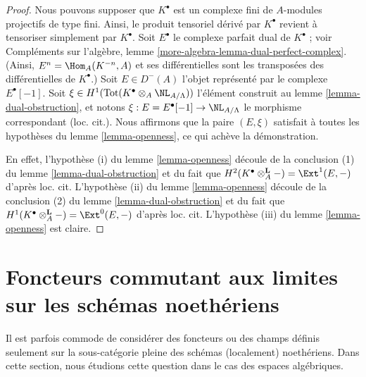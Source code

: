\begin{proof}
Nous pouvons supposer que $K^\bullet$ est un complexe fini de $A$-modules
projectifs de type fini. Ainsi, le produit tensoriel dérivé par $K^\bullet$
revient à tensoriser simplement par $K^\bullet$. Soit $E^\bullet$ le complexe
parfait dual de $K^\bullet$ ; voir Compléments sur l'algèbre, lemme
\ref{more-algebra-lemma-dual-perfect-complex}. (Ainsi,
$E^n = \Hom_A(K^{-n}, A)$ et ses différentielles sont les transposées des
différentielles de $K^\bullet$.) Soit $E \in D^{-}(A)$ l'objet représenté par
le complexe $E^\bullet[-1]$. Soit
$\xi \in H^1(\text{Tot}(K^\bullet \otimes_A \NL_{A/\Lambda}))$ l'élément
construit au lemme \ref{lemma-dual-obstruction}, et notons
$\xi : E = E^\bullet[-1] \to \NL_{A/\Lambda}$ le morphisme correspondant
(loc. cit.). Nous affirmons que la paire $(E, \xi)$ satisfait à toutes les
hypothèses du lemme \ref{lemma-openness}, ce qui achève la démonstration.

\medskip\noindent
En effet, l'hypothèse (i) du lemme \ref{lemma-openness} découle de la conclusion
(1) du lemme \ref{lemma-dual-obstruction} et du fait que
$H^2(K^\bullet \otimes_A^\mathbf{L} -) = \Ext^1(E, -)$ d'après loc. cit.
L'hypothèse (ii) du lemme \ref{lemma-openness} découle de la conclusion (2) du
lemme \ref{lemma-dual-obstruction} et du fait que
$H^1(K^\bullet \otimes_A^\mathbf{L} -) = \Ext^0(E, -)$ d'après loc. cit.
L'hypothèse (iii) du lemme \ref{lemma-openness} est claire.
\end{proof}







\section{Foncteurs commutant aux limites sur les schémas noethériens}
\label{section-noetherian}

\noindent
Il est parfois commode de considérer des foncteurs ou des champs définis
seulement sur la sous-catégorie pleine des schémas (localement) noethériens.
Dans cette section, nous étudions cette question dans le cas des espaces
algébriques.

